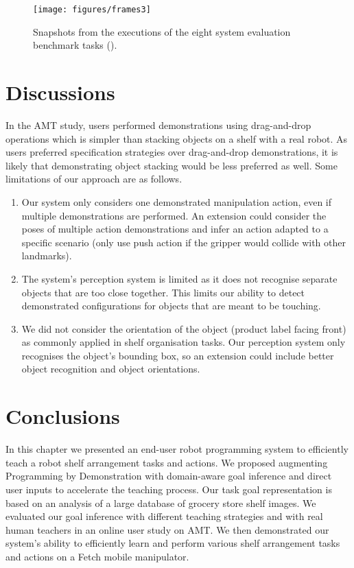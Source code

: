 \begin{figure}
	\texttt{[image: figures/frames3]}
	\caption{Snapshots from the executions of the eight system evaluation benchmark tasks ().}
	\label{fig:ppp-can}
\end{figure}


\section{Discussions}\label{sec:irosdiscussions}
In the AMT study, users performed demonstrations using drag-and-drop operations which is simpler than stacking objects on a shelf with a real robot. 
As users preferred specification strategies over drag-and-drop demonstrations, it is likely that demonstrating object stacking would be less preferred as well.
Some limitations of our approach are as follows.
\begin{enumerate}
	\item Our system only considers one demonstrated manipulation action, even if multiple demonstrations are performed. An extension could consider the poses of multiple action demonstrations and infer an action adapted to a specific scenario (\eg only use push action if the gripper would collide with other landmarks).
	\item The system's perception system is limited as it does not recognise separate objects that are too close together. This limits our ability to detect demonstrated configurations for objects that are meant to be touching.
	\item We did not consider the orientation of the object (\eg product label facing front) as commonly applied in shelf organisation tasks. Our perception system only recognises the object's bounding box, so an extension could include better object recognition and object orientations.
\end{enumerate}

\section{Conclusions}
\label{sec:irosconclusion}
In this chapter we presented an end-user robot programming system to efficiently teach a robot shelf arrangement tasks and actions.
We proposed augmenting Programming by Demonstration with domain-aware goal inference and direct user inputs to accelerate the teaching process.
Our task goal representation is based on an analysis of a large database of grocery store shelf images.
We evaluated our goal inference with different teaching strategies and with real human teachers in an online user study on AMT.
We then demonstrated our system's ability to efficiently learn and perform various shelf arrangement tasks and actions on a Fetch mobile manipulator.

